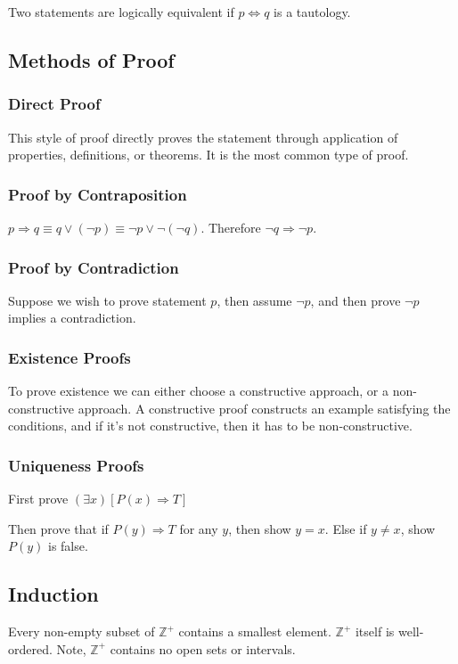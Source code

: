     Two statements are logically equivalent if $p \iff q$ is a tautology.

    \subsection{Methods of Proof}
        \subsubsection{Direct Proof}
        This style of proof directly proves the statement through application of properties, definitions, or theorems. It is the most common type of proof.

        \subsubsection{Proof by Contraposition}
        $p \Rightarrow q \equiv q \vee ( \neg p ) \equiv \neg p \vee \neg (\neg q)$. Therefore $\neg q \Rightarrow \neg p$.

        \subsubsection{Proof by Contradiction}
        Suppose we wish to prove statement $p$, then assume $\neg p$, and then prove $\neg p$ implies a contradiction.

        \subsubsection{Existence Proofs}
        To prove existence we can either choose a constructive approach, or a non-constructive approach. A constructive proof constructs an example satisfying the conditions, and if it's not constructive, then it has to be non-constructive.

        \subsubsection{Uniqueness Proofs}
        First prove $(\exists x)[P(x) \Rightarrow T]$

        Then prove that if $P(y) \Rightarrow T$ for any $y$, then show $y=x$. Else if $y \neq x$, show $P(y)$ is false.

    \subsection{Induction}
        \begin{thm}
            Every non-empty subset of $\mathbb{Z}^+$ contains a smallest element. $\mathbb{Z}^+$ itself is well-ordered. Note, $\mathbb{Z}^+$ contains no open sets or intervals.
        \end{thm}

